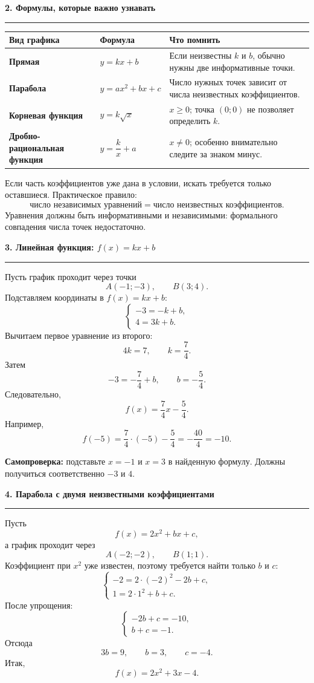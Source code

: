 \documentclass[a4paper,12pt]{article}
\newcommand{\topic}[1]{%
  \Needspace{7\baselineskip}%
  \vspace{0.45em}%
  {\Large\bfseries\color{darkaccent} #1}\par
  \vspace{0.2em}%
  {\color{accent}\rule{\linewidth}{0.7pt}}\par
  \vspace{0.35em}%
}
\begin{document}
\topic{2. Формулы, которые важно узнавать}

\begin{center}
\renewcommand{\arraystretch}{1.35}
\begin{tabularx}{\linewidth}{@{}>{\bfseries}l X X@{}}
\toprule
Вид графика & Формула & Что помнить \\
\midrule
Прямая & $y=kx+b$ & Если неизвестны $k$ и $b$, обычно нужны две информативные точки. \\
Парабола & $y=ax^2+bx+c$ & Число нужных точек зависит от числа неизвестных коэффициентов. \\
Корневая функция & $y=k\sqrt{x}$ & $x\ge0$; точка $(0;0)$ не позволяет определить $k$. \\
Дробно-рациональная функция & $y=\dfrac{k}{x}+a$ & $x\ne0$; особенно внимательно следите за знаком минус. \\
\bottomrule
\end{tabularx}
\end{center}

Если часть коэффициентов уже дана в условии, искать требуется только оставшиеся. Практическое правило:
\[
\boxed{\text{число независимых уравнений}=\text{число неизвестных коэффициентов}.}
\]
Уравнения должны быть информативными и независимыми: формального совпадения числа точек недостаточно.

\topic{3. Линейная функция: $f(x)=kx+b$}

Пусть график проходит через точки
\[
A(-1;-3),\qquad B(3;4).
\]
Подставляем координаты в $f(x)=kx+b$:
\[
\begin{cases}
-3=-k+b,\\
4=3k+b.
\end{cases}
\]
Вычитаем первое уравнение из второго:
\[
4k=7,\qquad k=\frac74.
\]
Затем
\[
-3=-\frac74+b,
\qquad
b=-\frac54.
\]
Следовательно,
\[
\boxed{f(x)=\frac74x-\frac54}.
\]
Например,
\[
f(-5)=\frac74\cdot(-5)-\frac54
=-\frac{40}{4}=-10.
\]

\textbf{Самопроверка:} подставьте $x=-1$ и $x=3$ в найденную формулу. Должны получиться соответственно $-3$ и $4$.

\topic{4. Парабола с двумя неизвестными коэффициентами}

Пусть
\[
f(x)=2x^2+bx+c,
\]
а график проходит через
\[
A(-2;-2),\qquad B(1;1).
\]
Коэффициент при $x^2$ уже известен, поэтому требуется найти только $b$ и $c$:
\[
\begin{cases}
-2=2\cdot(-2)^2-2b+c,\\
1=2\cdot1^2+b+c.
\end{cases}
\]
После упрощения:
\[
\begin{cases}
-2b+c=-10,\\
b+c=-1.
\end{cases}
\]
Отсюда
\[
3b=9,\qquad b=3,\qquad c=-4.
\]
Итак,
\[
\boxed{f(x)=2x^2+3x-4}.
\]
\end{document}
